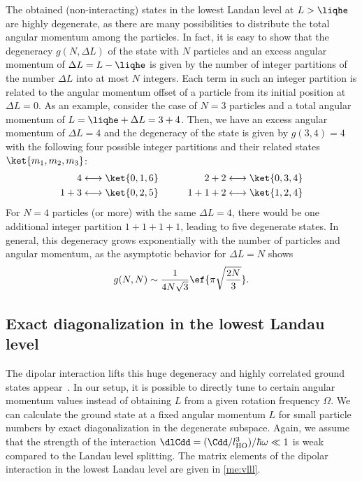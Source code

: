 The obtained (non-interacting) states in the lowest Landau level at $L>\liqhe$ are highly degenerate, as there are many possibilities to distribute the total angular momentum among the particles.
In fact, it is easy to show that the degeneracy $g(N, \Delta L)$ of the state with $N$ particles and an excess angular momentum of $\Delta L=L-\liqhe$ is given by the number
of integer partitions of the number $\Delta L$ into at most $N$ integers.
Each term in such an integer partition is related to the angular momentum offset of a particle from its initial position at $\Delta L = 0$.
As an example, consider the case of $N=3$ particles and a total angular momentum of $L=\liqhe + \Delta L = 3+4$. Then, we have an excess angular momentum of $\Delta L=4$ and the degeneracy of the state is given by $g(3,4)=4$ with the following four possible integer partitions and their related states $\ket{m_1,m_2,m_3}$:
\begin{align}
4 &\longleftrightarrow \ket{0,1,6} &\qquad 2+2 \longleftrightarrow \ket{0,3,4}\\
1+3 &\longleftrightarrow \ket{0,2,5}&\qquad 1+1+2 \longleftrightarrow \ket{1,2,4}
\end{align}
For $N = 4$ particles (or more) with the same $\Delta L=4$, there would be one additional integer partition $1+1+1+1$, leading to five degenerate states.
In general, this degeneracy grows exponentially with the number of particles and angular momentum, as the asymptotic behavior for $\Delta L = N$ shows~\cite{Hardy1918}
\begin{align}
g(N,N) \sim \frac{1}{4N\sqrt{3}} \ef{\pi \sqrt{\frac{2N}{3}}}.
\end{align}


\subsection{Exact diagonalization in the lowest Landau level}
The dipolar interaction lifts this huge degeneracy and highly correlated ground states appear~\cite{Cooper2005,Baranov2005,Osterloh2007,Qiu2011,Grass2011,Zhang2014}. In our setup, it is possible to directly tune to certain angular momentum values instead of obtaining $L$ from a given rotation frequency $\Omega$.
We can calculate the ground state at a fixed angular momentum $L$ for small particle numbers by exact diagonalization in the degenerate subspace.
Again, we assume that the strength of the interaction $\dlCdd=(\Cdd/l_\text{HO}^3)/\hbar\omega \ll 1$ is weak compared to the Landau level splitting.
The matrix elements of the dipolar interaction in the lowest Landau level are given in \cref{me:vlll}.

